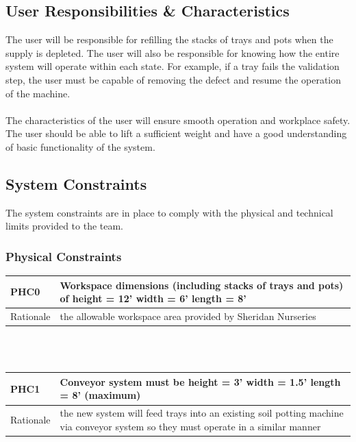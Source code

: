 \documentclass[12pt]{article}
\begin{document}
\subsection{User Responsibilities \& Characteristics}

The user will be responsible for refilling the stacks of trays and pots when the supply is depleted. 
The user will also be responsible for knowing how the entire system will operate within each state. 
For example, if a tray fails the validation step, the user must be capable of removing the defect and resume the operation of the machine.\\\\
\noindent The characteristics of the user will ensure smooth operation and workplace safety. The user should be 
able to lift a sufficient weight and have a good understanding of basic functionality of the system.


\subsection{System Constraints}

The system constraints are in place to comply with the physical and 
technical limits provided to the team.

\subsubsection{Physical Constraints}
\begin{tabular}{ |p{2cm}|p{14cm}| }
  \hline
  PHC0 & Workspace dimensions (including stacks of 
  trays and pots) of height = 12' width = 6' length = 8'\\
  \hline
  Rationale & the allowable workspace area provided by Sheridan Nurseries  \\ 

  \hline  
 \end{tabular}\\\\

 \noindent
 \begin{tabular}{ |p{2cm}|p{14cm}| }
  \hline
  PHC1 & Conveyor system must be height = 3'  
  width = 1.5' length = 8' (maximum) \\
  \hline
  Rationale & the new system will feed trays into an existing soil potting 
  machine via conveyor system so they must operate in a similar manner  \\ 

  \hline  
 \end{tabular}\\\\
\end{document}
